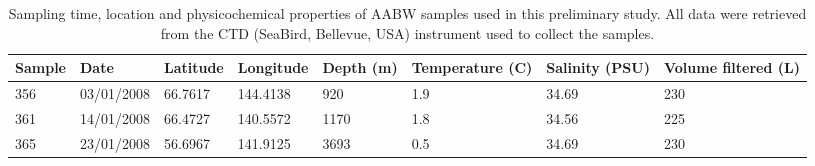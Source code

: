 \begin{table}
\sffamily
\footnotesize
\caption[\ac{AABW} samples used in the preliminary analysis]{Sampling time, location and physicochemical properties of \ac{AABW} samples used in this preliminary study.
All data were retrieved from the \ac{CTD} (SeaBird, Bellevue, USA) instrument used to collect the samples.}
\label{tab:deepsamples}
\begin{tabularx}{\textwidth}{llllXXXX}
\toprule
\textbf{Sample} & \textbf{Date} & \textbf{Latitude} & \textbf{Longitude} & \textbf{Depth (m)} & \textbf{Temperature (\textdegree{}C)} & \textbf{Salinity (PSU)} & \textbf{Volume \linebreak filtered (L)}\\
\midrule
356 & 03/01/2008 & \textminus{}66.7617 & 144.4138 & 920 & \textminus{}1.9 & 34.69 & 230\\
361 & 14/01/2008 & \textminus{}66.4727 & 140.5572 & 1170 & \textminus{}1.8 & 34.56 & 225\\
365 & 23/01/2008 & \textminus{}56.6967 & 141.9125 & 3693 & 0.5 & 34.69 & 230\\
\bottomrule
\end{tabularx}
\end{table}
